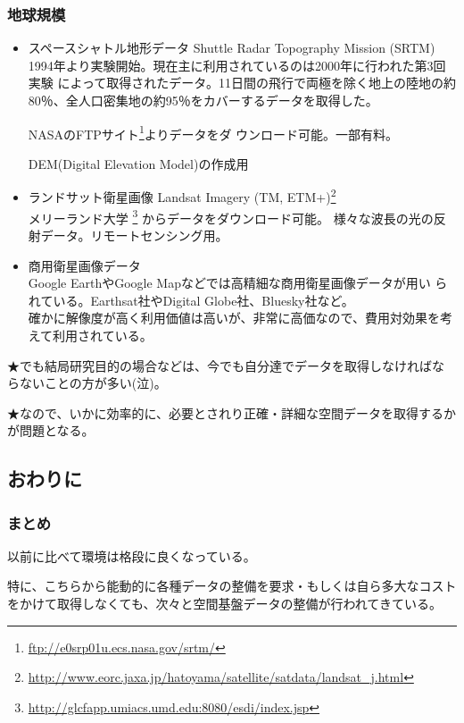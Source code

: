 \documentclass[mingoth,a4paper]{jsarticle}
\begin{document}
\subsubsection{地球規模}
\begin{itemize}
 \item スペースシャトル地形データ Shuttle Radar Topography Mission
       (SRTM)\\
       1994年より実験開始。現在主に利用されているのは2000年に行われた第3回実験
       によって取得されたデータ。11日間の飛行で両極を除く地上の陸地の約
       80％、全人口密集地の約95％をカバーするデータを取得した。

       NASAのFTPサイト\footnote{\url{ftp://e0srp01u.ecs.nasa.gov/srtm/}}よりデータをダ
       ウンロード可能。一部有料。

       DEM(Digital Elevation Model)の作成用
 \item ランドサット衛星画像 Landsat Imagery (TM,
       ETM+)\footnote{\url{http://www.eorc.jaxa.jp/hatoyama/satellite/satdata/landsat_j.html}}\\
       メリーランド大学
       \footnote{\url{http://glcfapp.umiacs.umd.edu:8080/esdi/index.jsp}}
       からデータをダウンロード可能。
       様々な波長の光の反射データ。リモートセンシング用。
 \item 商用衛星画像データ\\
       Google EarthやGoogle Mapなどでは高精細な商用衛星画像データが用い
       られている。Earthsat社やDigital Globe社、Bluesky社など。\\
       確かに解像度が高く利用価値は高いが、非常に高価なので、費用対効果を考えて利用されている。
\end{itemize}

★でも結局研究目的の場合などは、今でも自分達でデータを取得しなければな
らないことの方が多い(泣)。

★なので、いかに効率的に、必要とされり正確・詳細な空間データを取得するかが問題となる。

\subsection{おわりに}
\subsubsection{まとめ}
以前に比べて環境は格段に良くなっている。

特に、こちらから能動的に各種データの整備を要求・もしくは自ら多大なコスト
をかけて取得しなくても、次々と空間基盤データの整備が行われてきている。
\end{document}
